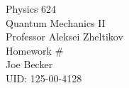 \begin{titlepage}
\setlength{\topmargin}{1.5in}
\begin{center}
\Huge{Physics 624} \\
\LARGE{Quantum Mechanics II} \\
\Large{Professor Aleksei Zheltikov} \\[1cm]

\huge{Homework \#\HWnum}\\[0.5cm]

\large{Joe Becker} \\
\large{UID: 125-00-4128} \\
\large{\due} 

\end{center}

\end{titlepage}

